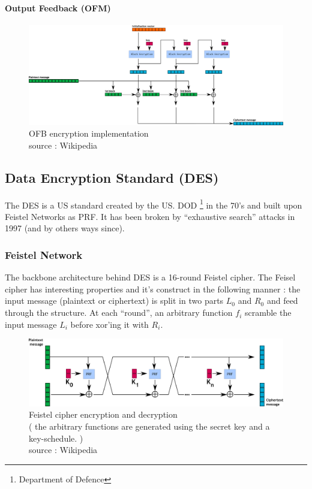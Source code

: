 \paragraph{ Output Feedback (OFM) }

\begin{figure}[h!]
    \centering
       \includegraphics[width=\textwidth]{images/OFB.png}
	\caption{OFB encryption implementation \\ source : Wikipedia}
	\label{fig:OFB_encryption_impl}
\end{figure}


\subsection{Data Encryption Standard (DES)}

The DES is a US standard created by the US. DOD \footnote{Department of Defence} in the 70's and built upon Feistel Networks as PRF. It has been broken by ``exhaustive search'' attacks in 1997 (and by others ways since).

\subsubsection{Feistel Network}

The backbone architecture behind DES is a 16-round Feistel cipher. The Feisel cipher has interesting properties and it's construct in the following manner : the input message (plaintext or ciphertext) is split in two parts $L_0$ and $R_0$ and feed through the structure. At each ``round'', an arbitrary function $f_i$ scramble the input message $L_i$ before xor'ing it with $R_i$.

\begin{figure}[ht!]
    \centering
       \includegraphics[width=\textwidth]{images/Feistel_encryption.png}
    \caption{Feistel cipher encryption and decryption \\ ( the arbitrary functions are generated using the secret key and a key-schedule. )\\ source : Wikipedia}
	\label{fig:Feistel_cipher}
\end{figure}
 


